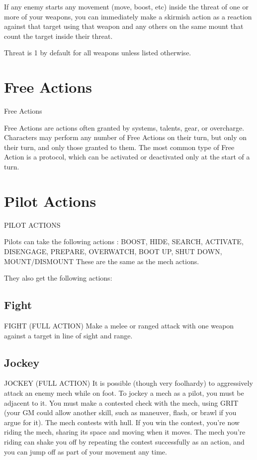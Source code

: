 If any enemy starts any movement (move, boost, etc) inside the threat of one or more of your
weapons, you can immediately make a skirmish action as a reaction against that target using
that weapon and any others on the same mount that count the target inside their threat.


Threat is 1 by default for all weapons unless listed otherwise.

\section{Free Actions}
   Free Actions

Free Actions are actions often granted by systems, talents, gear, or overcharge. Characters may
perform any number of Free Actions on their turn, but only on their turn, and only those granted
to them. The most common type of Free Action is a protocol, which can be activated or
deactivated only at the start of a turn.

\section{Pilot Actions}
   PILOT ACTIONS

Pilots can take the following actions : BOOST, HIDE, SEARCH, ACTIVATE, DISENGAGE,
PREPARE, OVERWATCH, BOOT UP, SHUT DOWN, MOUNT/DISMOUNT
These are the same as the mech actions.


They also get the following actions:

\subsection{Fight}
                                      FIGHT (FULL ACTION)
Make a melee or ranged attack with one weapon against a target in line of sight and range.

\subsection{Jockey}

                                    JOCKEY (FULL ACTION)
It is possible (though very foolhardy) to aggressively attack an enemy mech while on foot. To
jockey a mech as a pilot, you must be adjacent to it. You must make a contested check with the
mech, using GRIT (your GM could allow another skill, such as maneuver, flash, or brawl if you
argue for it). The mech contests with hull. If you win the contest, you’re now riding the mech,
sharing its space and moving when it moves. The mech you’re riding can shake you off by
repeating the contest successfully as an action, and you can jump off as part of your movement
any time.



